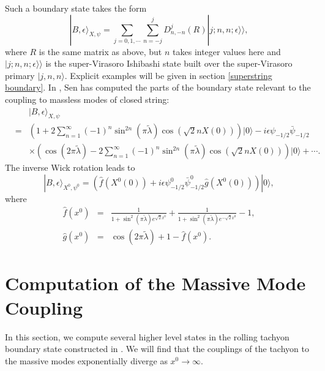 \documentclass[a4paper,12pt]{article} \textheight=8.5truein
\newcommand{\ra}{\rightarrow}
\begin{document}
Such a boundary state takes the form
\begin{equation}
   |B,\epsilon\rangle_{X,\psi}=
\sum_{j=0,1,\cdots}\sum_{n=-j}^j D^j_{n,-n}(R)|j;n,n;\epsilon\rangle\rangle,
\end{equation}
where $R$ is the same matrix as above, but $n$ takes integer
values here and $|j;n,n;\epsilon\rangle\rangle$ is the
super-Virasoro Ishibashi state built over the super-Virasoro
primary $|j,n,n\rangle$. Explicit examples will be given in
section \ref{superstring boundary}. In \cite{Sen:2002in}, Sen has
computed the parts of the boundary state relevant to the coupling
to massless modes of closed string:
\begin{eqnarray}\label{BXpsi}
  && |B,\epsilon\rangle_{X,\psi}\nonumber\\
&=&
\left(1+2\sum_{n=1}^{\infty}(-1)^n\sin^{2n}(\pi\tilde{\lambda})
\cos(\sqrt{2}n X(0))\right)|0\rangle -i\epsilon
\psi_{-1/2}\bar{\psi}_{-1/2}
\nonumber\\
&& \times\left(\cos(2\pi\tilde{\lambda})
-2\sum_{n=1}^{\infty}(-1)^n\sin^{2n}(\pi\tilde{\lambda})
\cos(\sqrt{2}n X(0))\right)|0\rangle+\cdots.
\end{eqnarray}
The inverse Wick rotation leads to
\begin{equation}\label{BX0psi}
|B,\epsilon\rangle_{X^0,\psi^0}= \left( \hat f(X^0(0))+ i \epsilon
\psi_{-1/2}^0\bar{\psi}_{-1/2}^0 \hat g(X^0(0))\right)|0\rangle,
\end{equation}
where
\begin{eqnarray}
\hat f(x^0)&=&\frac{1}{1+\sin^2(\pi\tilde{\lambda} )e^{\sqrt{2}x^0}}
+\frac{1}{1+\sin^2(\pi\tilde\lambda) e^{-\sqrt{2}x^0}}-1,\\
\hat g(x^0)&=&\cos(2\pi\tilde{\lambda})+1-\hat f(x^0).
\end{eqnarray}

\section{Computation of the Massive Mode Coupling}\label{massive}
In this section, we compute several higher level states in the
rolling tachyon boundary state constructed in
\cite{Sen:2002nu,Sen:2002in}. We will find that the couplings of
the tachyon to the massive modes exponentially diverge as $x^0 \ra
\infty$.
\end{document}
